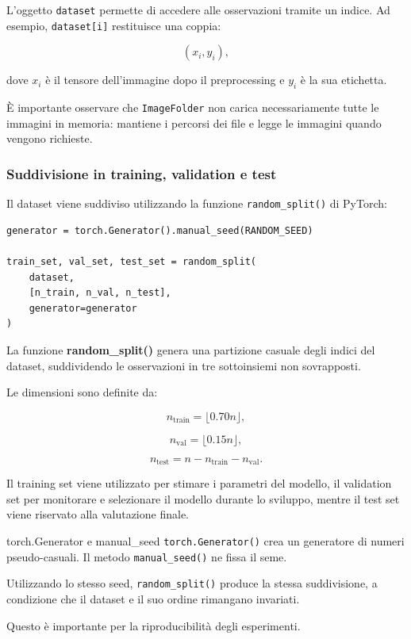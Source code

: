 \documentclass[10pt,a4paper,oneside]{book}
\begin{document}
L'oggetto \texttt{dataset} permette di accedere alle osservazioni
tramite un indice. Ad esempio, \texttt{dataset[i]} restituisce
una coppia:

\[
(x_i,y_i),
\]

dove $x_i$ è il tensore dell'immagine dopo il preprocessing
e $y_i$ è la sua etichetta.

È importante osservare che \texttt{ImageFolder} non carica
necessariamente tutte le immagini in memoria: mantiene i percorsi
dei file e legge le immagini quando vengono richieste.

\subsubsection{Suddivisione in training, validation e test}

Il dataset viene suddiviso utilizzando la funzione
\texttt{random\_split()} di PyTorch:

\begin{verbatim}
generator = torch.Generator().manual_seed(RANDOM_SEED)

train_set, val_set, test_set = random_split(
    dataset,
    [n_train, n_val, n_test],
    generator=generator
)
\end{verbatim}

La funzione \textbf{random\_split()} genera una partizione casuale
degli indici del dataset, suddividendo le osservazioni in tre
sottoinsiemi non sovrapposti.

Le dimensioni sono definite da:

\[
n_{\mathrm{train}} = \lfloor 0.70n \rfloor,
\]

\[
n_{\mathrm{val}} = \lfloor 0.15n \rfloor,
\]

\[
n_{\mathrm{test}}
=
n-n_{\mathrm{train}}-n_{\mathrm{val}}.
\]

Il training set viene utilizzato per stimare i parametri del modello,
il validation set per monitorare e selezionare il modello durante
lo sviluppo, mentre il test set viene riservato alla valutazione finale.

\begin{definitionbox}{torch.Generator e manual\_seed}
\texttt{torch.Generator()} crea un generatore di numeri
pseudo-casuali. Il metodo \texttt{manual\_seed()} ne fissa il seme.

Utilizzando lo stesso seed, \texttt{random\_split()} produce
la stessa suddivisione, a condizione che il dataset e il suo ordine
rimangano invariati.

Questo è importante per la riproducibilità degli esperimenti.
\end{definitionbox}
\end{document}

